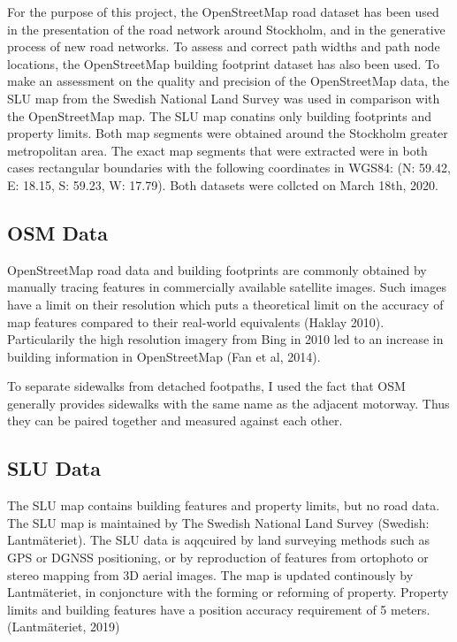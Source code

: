 \documentclass[a4paper]{article}
\begin{document}
For the purpose of this project, the OpenStreetMap road dataset has been used in the presentation of the road network around Stockholm, and in the generative process of new road networks. To assess and correct path widths and path node locations, the OpenStreetMap building footprint dataset has also been used. To make an assessment on the quality and precision of the OpenStreetMap data, the SLU map from the Swedish National Land Survey was used in comparison with the OpenStreetMap map. The SLU map conatins only building footprints and property limits. Both map segments were obtained around the Stockholm greater metropolitan area.
The exact map segments that were extracted were in both cases rectangular boundaries with the following coordinates in WGS84: (N: 59.42, E: 18.15, S: 59.23, W: 17.79).
Both datasets were collcted on March 18th, 2020.

\subsection{OSM Data}

OpenStreetMap road data and building footprints are commonly obtained by manually tracing features in commercially available satellite images. Such images have a limit on their resolution which puts a theoretical limit on the accuracy of map features compared to their real-world equivalents (Haklay 2010). Particularily the high resolution imagery from Bing in 2010 led to an increase in building information in OpenStreetMap (Fan et al, 2014).

To separate sidewalks from detached footpaths, I used the fact that OSM generally provides sidewalks with the same name as the adjacent motorway. Thus they can be paired together and measured against each other.

\subsection{SLU Data}

The SLU map contains building features and property limits, but no road data.
The SLU map is maintained by The Swedish National Land Survey (Swedish: Lantmäteriet).
The SLU data is aqqcuired by land surveying methods such as GPS or DGNSS positioning, or by reproduction of features from ortophoto or stereo mapping from 3D aerial images.
The map is updated continously by Lantmäteriet, in conjoncture with the forming or reforming of property.
Property limits and building features have a position accuracy requirement of 5 meters.
(Lantmäteriet, 2019)
\end{document}
